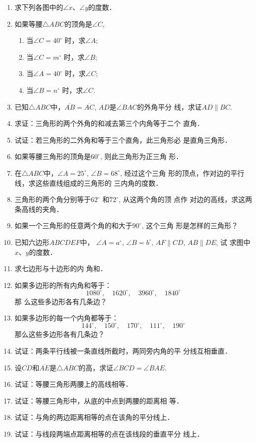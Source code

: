 \begin{ex}
\begin{enumerate}
    \item 求下列各图中的$\angle x$、$\angle y$的度数．
    \item 如果等腰$\triangle ABC$的顶角是$\angle C$, 
\begin{enumerate}
\item 当$\angle C=40^{\circ}$ 时，求$\angle A$;
\item 当$\angle C=m^{\circ}$ 时，求$\angle B$;
\item 当$\angle A=40^{\circ}$ 时，求$\angle C$;
\item 当$\angle B=n^{\circ}$ 时，求$\angle C$.
\end{enumerate}

\item 已知$\triangle ABC$中，$\overline{AB}=\overline{AC}$, $AD$是$\angle BAC$的外角平分
    线，求证$AD\parallel BC$.
    \item 求证：三角形的两个外角的和减去第三个内角等于二个
    直角．
    \item 试证：若三角形的二外角和等于三个直角，此三角形必
    是直角三角形．
    \item 如果等腰三角形的顶角是$60^{\circ}$, 则此三角形为正三角
    形．
    \item 在$\triangle ABC$中，$\angle A=25^{\circ}$, $\angle B=68^{\circ}$, 经过这个三角
    形的顶点，作对边的平行线，求这些直线组成的三角形的
    三内角的度数．
    \item 三角形的两个角分别等于$62^{\circ}$ 和$72^{\circ}$, 从这两个角的顶
    点作
    对边的高线，求这两条高线的夹角．
    \item 如果一个三角形的任意两个角的和大于$90^{\circ}$, 这个三角
    形是怎样的三角形？
\item 已知六边形$ABCDEF$中，
$\angle A=a^{\circ}$, $\angle B=b^{\circ}$, 
$AF\parallel CD$, $AB\parallel DE$, 试
求图中$x$、$y$的度数．
\item 求七边形与十边形的内
角和．
\item 如果多边形的所有内角和等于：
\[1080^{\circ} ,\quad 1620^{\circ}  ,\quad 3960^{\circ}  ,\quad 1840^{\circ}\]那
么这些多边形各有几条边？
\item 如果多边形的每一个内角都等于：
\[144^{\circ} ,\quad 150^{\circ}  ,\quad 170^{\circ}  ,\quad 111^{\circ} 
,\quad 190^{\circ}\] 
那么这些多边形各有几条边？
\item 试证：两条平行线被一条直线所截时，两同旁内角的平
分线互相垂直．
\item 设$\overline{CD}$和$\overline{AE}$是$\triangle ABC$的高，求证$\angle BCD=\angle BAE$.
\item 试证：等腰三角形两腰上的高线相等．
\item 试证：等腰三角形中，从底的中点到两腰的距离相
等．
\item 试证：与角的两边距离相等的点在该角的平分线上．
\item 试证：与线段两端点距离相等的点在该线段的垂直平分
线上．
\end{enumerate}
\end{ex}

